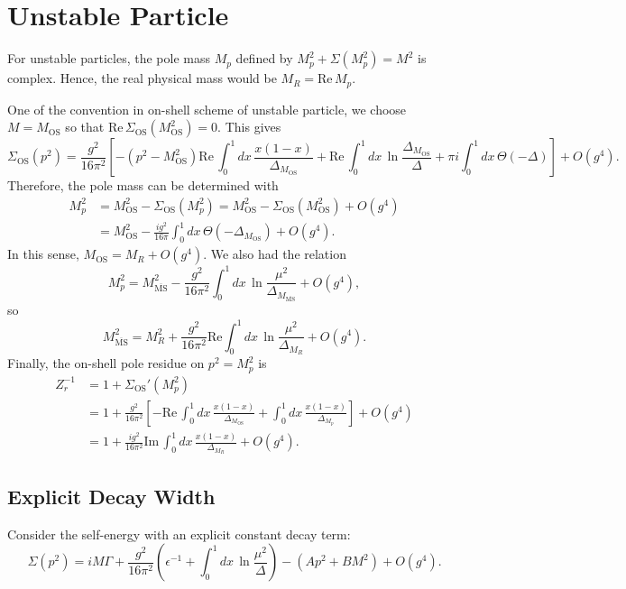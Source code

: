 \documentclass[11pt]{article}
\theoremstyle{definition}
\theoremstyle{remark}
\begin{document}
	\section{Unstable Particle}
	For unstable particles, the pole mass $M_{p}$ defined by $M_{p}^{2}+\Sigma(M_{p}^{2})=M^{2}$ is complex.
	Hence, the real physical mass would be $M_{R}=\mathrm{Re}\,M_{p}$.
	
	One of the convention in on-shell scheme of unstable particle, we choose $M=M_{\mathrm{OS}}$ so that $\mathrm{Re}\,\Sigma_{\mathrm{OS}}(M_{\mathrm{OS}}^{2})=0$.
	This gives
	\[\Sigma_{\mathrm{OS}}(p^{2})=\frac{g^{2}}{16\pi^{2}}\left[-(p^{2}-M_{\mathrm{OS}}^{2})\mathrm{Re}\,\int_{0}^{1}dx\,\frac{x(1-x)}{\Delta_{M_{\mathrm{OS}}}}+\mathrm{Re}\,\int_{0}^{1}dx\,\ln\frac{\Delta_{M_{\mathrm{OS}}}}{\Delta}+\pi i\int_{0}^{1}dx\,\Theta(-\Delta)\right]+O(g^{4}).\]
	Therefore, the pole mass can be determined with
	\begin{align*}
		M_{p}^{2}&=M_{\mathrm{OS}}^{2}-\Sigma_{\mathrm{OS}}(M_{p}^{2})=M_{\mathrm{OS}}^{2}-\Sigma_{\mathrm{OS}}(M_{\mathrm{OS}}^{2})+O(g^{4})\\
		&=M_{\mathrm{OS}}^{2}-\frac{ig^{2}}{16\pi}\int_{0}^{1}dx\,\Theta(-\Delta_{M_{\mathrm{OS}}})+O(g^{4}).
	\end{align*}
	In this sense, $M_{\mathrm{OS}}=M_{R}+O(g^{4})$.
	We also had the relation
	\[M_{p}^{2}=M_{\overline{\mathrm{MS}}}^{2}-\frac{g^{2}}{16\pi^{2}}\int_{0}^{1}dx\,\ln\frac{\mu^{2}}{\Delta_{M_{\overline{\mathrm{MS}}}}}+O(g^{4}),\]
	so
	\[M_{\overline{\mathrm{MS}}}^{2}=M_{R}^{2}+\frac{g^{2}}{16\pi^{2}}\mathrm{Re}\int_{0}^{1}dx\,\ln\frac{\mu^{2}}{\Delta_{M_{R}}}+O(g^{4}).\]
	Finally, the on-shell pole residue on $p^{2}=M_{p}^{2}$ is
	\begin{align*}
		Z_{r}^{-1}&=1+\Sigma_{\mathrm{OS}}'(M_{p}^{2})\\
		&=1+\frac{g^{2}}{16\pi^{2}}\left[-\mathrm{Re}\,\int_{0}^{1}dx\,\frac{x(1-x)}{\Delta_{M_{\mathrm{OS}}}}+\int_{0}^{1}dx\,\frac{x(1-x)}{\Delta_{M_{p}}}\right]+O(g^{4})\\
		&=1+\frac{ig^{2}}{16\pi^{2}}\mathrm{Im}\,\int_{0}^{1}dx\,\frac{x(1-x)}{\Delta_{M_{R}}}+O(g^{4}).
	\end{align*}
	
	\subsection{Explicit Decay Width}
	Consider the self-energy with an explicit constant decay term:
	\[\Sigma(p^{2})=iM\Gamma+\frac{g^{2}}{16\pi^{2}}\left(\epsilon^{-1}+\int_{0}^{1}dx\,\ln\frac{\mu^{2}}{\Delta}\right)-(Ap^{2}+BM^{2})+O(g^{4}).\]	
	
\end{document}
